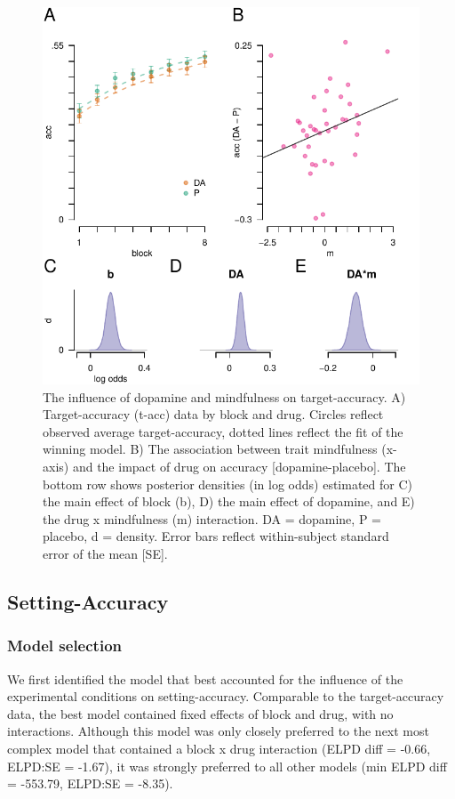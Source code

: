 \documentclass[
  man]{apa6}
\begin{document}
\begin{figure}

{\centering \includegraphics[width=0.7\linewidth]{../../images/acc_fig} 

}

\caption{The influence of dopamine and mindfulness on target-accuracy. A) Target-accuracy (t-acc) data by block and drug. Circles reflect observed average target-accuracy, dotted lines reflect the fit of the winning model. B) The association between trait mindfulness (x-axis) and the impact of drug on accuracy [dopamine-placebo]. The bottom row shows posterior densities (in log odds) estimated for C) the main effect of block (b), D) the main effect of dopamine, and E) the drug x mindfulness (m) interaction. DA = dopamine, P = placebo, d = density. Error bars reflect within-subject standard error of the mean [SE].}\label{fig:accfig}
\end{figure}

\hypertarget{setting-accuracy-1}{%
\subsection{Setting-Accuracy}\label{setting-accuracy-1}}

\label{sec:Setting-Accuracy Results}

\hypertarget{model-selection-1}{%
\subsubsection{Model selection}\label{model-selection-1}}

We first identified the model that best accounted for the influence of the experimental conditions on setting-accuracy. Comparable to the target-accuracy data, the best model contained fixed effects of block and drug, with no interactions. Although this model was only closely preferred to the next most complex model that contained a block x drug interaction (ELPD diff = -0.66, ELPD:SE = -1.67), it was strongly preferred to all other models (min ELPD diff = -553.79, ELPD:SE = -8.35).
\end{document}
